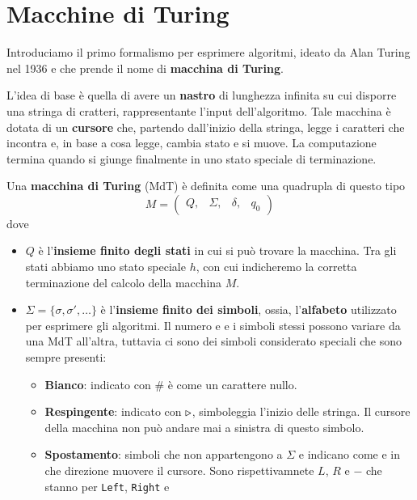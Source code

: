 \chapter{Macchine di Turing}
Introduciamo il primo formalismo per esprimere algoritmi, ideato
da Alan Turing nel 1936 e che prende il nome di
\textbf{macchina di Turing}.

L'idea di base è quella di avere un \textbf{nastro} di lunghezza
infinita su cui disporre una stringa di cratteri, rappresentante
l'input dell'algoritmo. Tale macchina è dotata di un
\textbf{cursore} che, partendo dall'inizio della stringa, legge
i caratteri che incontra e, in base a cosa legge, cambia stato
e si muove. La computazione termina quando si giunge finalmente
in uno stato speciale di terminazione.

\begin{definition}
	Una \textbf{macchina di Turing} (MdT) è definita come una
	quadrupla di questo tipo
	\[
		M = \begin{pmatrix}
			Q, & \Sigma, & \delta, & q_0
		\end{pmatrix}
	\]
	dove
	\begin{itemize}
		\item $Q$ è l'\textbf{insieme finito degli stati} in
		      cui si può trovare la macchina. Tra gli stati
		      abbiamo uno stato speciale $h$, con cui
		      indicheremo la corretta terminazione del calcolo
		      della macchina $M$.
		\item $\Sigma = \{ \sigma, \sigma', \dots \}$ è
		      l'\textbf{insieme finito dei simboli}, ossia,
		      l'\textbf{alfabeto} utilizzato per esprimere
		      gli algoritmi. Il numero e e i simboli stessi
		      possono variare da una MdT all'altra, tuttavia
		      ci sono dei simboli considerato speciali che sono
		      sempre presenti:
		      \begin{itemize}
			      \item \textbf{Bianco}: indicato con $\#$ è
			            come un carattere nullo.
			      \item \textbf{Respingente}: indicato con
			            $\triangleright$, simboleggia l'inizio delle
			            stringa. Il cursore della macchina non
			            può andare mai a sinistra di questo
			            simbolo.
			      \item \textbf{Spostamento}: simboli che non
			            appartengono a $\Sigma$ e indicano come
			            e in che direzione muovere il cursore.
			            Sono rispettivamnete $L$, $R$ e $-$ che
			            stanno per \verb|Left|, \verb|Right| e

\end{itemize}
\end{itemize}
\end{definition}
